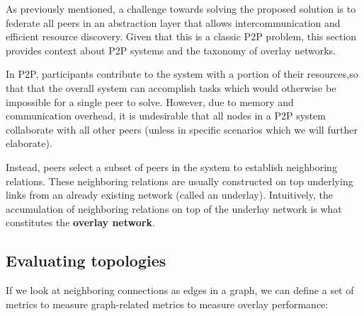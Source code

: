 

As previously mentioned, a challenge towards solving the proposed solution is to federate all peers in an abstraction layer that allows intercommunication and efficient resource discovery. Given that this is a classic P2P problem, this section provides context about P2P systems and the taxonomy of overlay networks.

In P2P, participants contribute to the system with a portion of their resources,so that that the overall system can accomplish tasks which would otherwise be impossible for a single peer to solve. However, due to memory and communication overhead, it is undesirable that all nodes in a P2P system collaborate with all other peers (unless in specific scenarios which we will further elaborate). 

Instead, peers select a subset of peers in the system to establish neighboring relations. These neighboring relations are usually constructed on top underlying links from an already existing network (called an underlay). Intuitively, the accumulation of neighboring relations on top of the underlay network is what constitutes the \textbf{overlay network}. 

\subsection{Evaluating topologies}

If we look at neighboring connections as edges in a graph, we can define a set of metrics to measure graph-related metrics to measure overlay performance:


